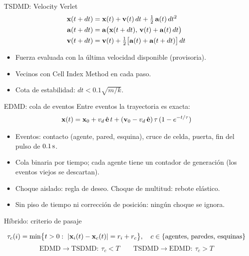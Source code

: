 \begin{frame}{TSDMD: Velocity Verlet}
  \small
  \begin{align*}
    \mathbf{x}(t+dt) &= \mathbf{x}(t) + \mathbf{v}(t)\,dt + \tfrac12\,\mathbf{a}(t)\,dt^2\\
    \mathbf{a}(t+dt) &= \mathbf{a}\bigl(\mathbf{x}(t+dt),\,\mathbf{v}(t)+\mathbf{a}(t)\,dt\bigr)\\
    \mathbf{v}(t+dt) &= \mathbf{v}(t) + \tfrac12\bigl[\mathbf{a}(t)+\mathbf{a}(t+dt)\bigr]\,dt
  \end{align*}
  \begin{itemize}
    \item Fuerza evaluada con la última velocidad disponible (provisoria).
    \item Vecinos con Cell Index Method en cada paso.
    \item Cota de estabilidad: $dt < 0.1\sqrt{m/k}$.
  \end{itemize}
\end{frame}

\begin{frame}{EDMD: cola de eventos}
  \small
  Entre eventos la trayectoria es exacta:
  \[
    \mathbf{x}(t) = \mathbf{x}_0 + v_d\,\hat{\mathbf{e}}\,t
      + (\mathbf{v}_0 - v_d\,\hat{\mathbf{e}})\,\tau\,(1-e^{-t/\tau})
  \]
  \begin{itemize}
    \item Eventos: contacto (agente, pared, esquina), cruce de celda, puerta, fin del pulso de $0.1\,\mathrm{s}$.
    \item Cola binaria por tiempo; cada agente tiene un contador de generación (los eventos viejos se descartan).
    \item Choque aislado: regla de deseo. Choque de multitud: rebote elástico.
    \item Sin piso de tiempo ni corrección de posición: ningún choque se ignora.
  \end{itemize}
\end{frame}

\begin{frame}{Híbrido: criterio de pasaje}
  \centering

  \vspace{8pt}
  \[
    \tau_c(i)=\min\bigl\{t>0:\ |\mathbf{x}_i(t)-\mathbf{x}_c(t)| = r_i + r_c\bigr\},
    \quad c\in\{\text{agentes, paredes, esquinas}\}
  \]
  \[
    \text{EDMD}\to\text{TSDMD}:\ \tau_c < T
    \qquad
    \text{TSDMD}\to\text{EDMD}:\ \tau_c > T
  \]
  \vfill
\end{frame}

